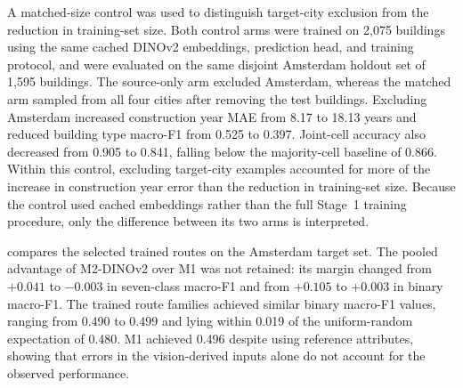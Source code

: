 A matched-size control was used to distinguish target-city exclusion from the reduction in training-set size.
Both control arms were trained on 2,075 buildings using the same cached DINOv2 embeddings, prediction head, and training protocol, and were evaluated on the same disjoint Amsterdam holdout set of 1,595 buildings.
The source-only arm excluded Amsterdam, whereas the matched arm sampled from all four cities after removing the test buildings.
Excluding Amsterdam increased construction year MAE from 8.17 to 18.13 years and reduced building type macro-F1 from 0.525 to 0.397.
Joint-cell accuracy also decreased from 0.905 to 0.841, falling below the majority-cell baseline of 0.866.
Within this control, excluding target-city examples accounted for more of the increase in construction year error than the reduction in training-set size.
Because the control used cached embeddings rather than the full Stage~1 training procedure, only the difference between its two arms is interpreted.

 compares the selected trained routes on the Amsterdam target set.
The pooled advantage of M2-DINOv2 over M1 was not retained: its margin changed from $+0.041$ to $-0.003$ in seven-class macro-F1 and from $+0.105$ to $+0.003$ in binary macro-F1.
The trained route families achieved similar binary macro-F1 values, ranging from 0.490 to 0.499 and lying within 0.019 of the uniform-random expectation of 0.480.
M1 achieved 0.496 despite using reference attributes, showing that errors in the vision-derived inputs alone do not account for the observed performance.

